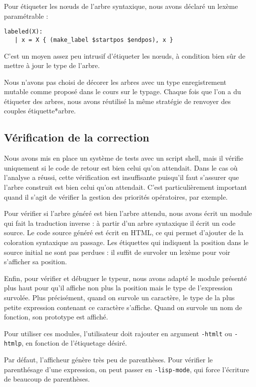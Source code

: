 \documentclass[a4paper]{article}
\begin{document}
Pour étiqueter les nœuds de l'arbre syntaxique, nous avons déclaré un lexème paramétrable :

\begin{verbatim}
labeled(X):
   | x = X { (make_label $startpos $endpos), x }
\end{verbatim}

C'est un moyen assez peu intrusif d'étiqueter les nœuds, à condition bien sûr de mettre à jour le type de l'arbre.

Nous n'avons pas choisi de décorer les arbres avec un type
 enregistrement mutable comme proposé dans le cours sur le typage.
Chaque fois que l'on a du étiqueter des arbres, nous avons réutilisé la
même stratégie de renvoyer des couples étiquette*arbre.

\subsection{Vérification de la correction}
\label{subsec:html}

Nous avons mis en place un système de tests avec un script shell, mais il vérifie uniquement si le code de retour est bien celui qu'on attendait.
Dans le cas où l'analyse a réussi, cette vérification est insuffisante puisqu'il faut s'assurer que l'arbre construit est bien celui qu'on attendait.
C'est particulièrement important quand il s'agit de vérifier la gestion des priorités opératoires, par exemple.

Pour vérifier si l'arbre généré est bien l'arbre attendu, nous avons écrit un module qui fait la traduction inverse :
à partir d'un arbre syntaxique il écrit un code source.
Le code source généré est écrit en HTML, ce qui permet d'ajouter de la coloration syntaxique au passage.
Les étiquettes qui indiquent la position dans le source initial ne sont pas perdues :
il suffit de survoler un lexème pour voir s'afficher sa position.

Enfin, pour vérifier et débuguer le typeur, nous avons adapté le module
présenté plus haut pour qu'il affiche non plus la position mais le type
de l'expression survolée.
Plus précisément, quand on survole un caractère, le type de la plus petite expression contenant ce caractère s'affiche.
Quand on survole un nom de fonction, son prototype est affiché.

Pour utiliser ces modules, l'utilisateur doit rajouter en argument
\texttt{-htmlt} ou \texttt{-htmlp}, en fonction de l'étiquetage désiré.

Par défaut, l'afficheur génère très peu de parenthèses.
Pour vérifier le parenthésage d'une expression, on peut passer en \texttt{-lisp-mode}, qui force l'écriture de beaucoup de parenthèses.
\end{document}
